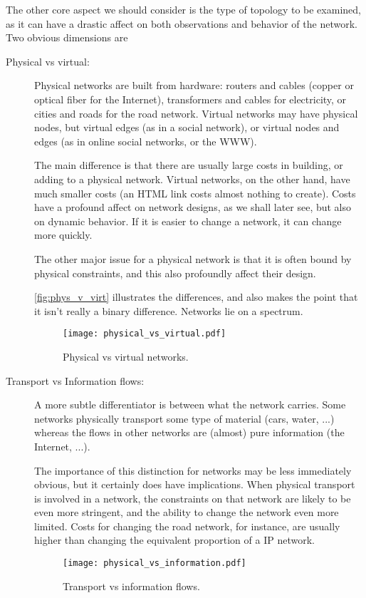 The other core aspect we should consider is the type of topology to be
examined, as it can have a drastic affect on both observations and
behavior of the network. Two obvious dimensions are
\begin{description}
\item[Physical vs virtual:] Physical networks are built from hardware:
  routers and cables (copper or optical fiber for the Internet),
  transformers and cables for electricity, or cities and roads for the
  road network. Virtual networks may have physical nodes, but virtual
  edges (as in a social network), or virtual nodes and edges (as in
  online social networks, or the WWW). 

  The main difference is that there are usually large costs in
  building, or adding to a physical network. Virtual networks, on the
  other hand, have much smaller costs (an HTML link costs almost
  nothing to create). Costs have a profound affect on network designs,
  as we shall later see, but also on dynamic behavior. If it is
  easier to change a network, it can change more quickly.

  The other major issue for a physical network is that it is often
  bound by physical constraints, and this also profoundly affect their
  design.

  \autoref{fig:phys_v_virt} illustrates the differences, and also makes the point
  that it isn't really a binary difference. Networks lie on a spectrum.

\begin{figure}[htp]
  \begin{center}
    \texttt{[image: physical\_vs\_virtual.pdf]}
    \caption{Physical vs virtual networks.\label{fig:phys_v_virt}}
  \end{center} 
\end{figure}


\item[Transport vs Information flows:] A more subtle differentiator
  is between what the network carries. Some networks physically
  transport some type of material (cars, water, ...) whereas the flows
  in other networks are (almost) pure information (the Internet,
  ...).  

  The importance of this distinction for networks may be less
  immediately obvious, but it certainly does have implications. When
  physical transport is involved in a network, the constraints on that
  network are likely to be even more stringent, and the ability to
  change the network even more limited. Costs for changing the road
  network, for instance, are usually higher than changing the
  equivalent proportion of a IP network.

\begin{figure}[htp]
  \begin{center}
     \texttt{[image: physical\_vs\_information.pdf]}
 
    \caption{Transport vs information flows.\label{fig:trans_v_inf}}
  \end{center}
\end{figure}         

\end{description}
